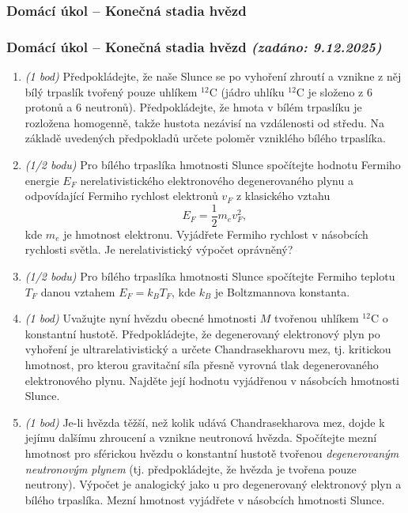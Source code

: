 \documentclass[a4paper,11pt,twoside]{article}
\newenvironment{homework}{}{}
\newcommand{\np}{\clearpage\newpage}
\newcommand{\exercise}[2][]{\ifthenelse{\isempty{#1}}
	{\np\thispagestyle{empty}\subsubsection*{Domácí úkol -- #2}}
	{\np\thispagestyle{empty}\np\subsubsection*{Domácí úkol -- #2 \small{\it{(zadáno: {#1})}}}}
}
\begin{document}
\begin{homework}
	\exercise[9.12.2025]{Konečná stadia hvězd}
		\begin{enumerate}
			\item \emph{(1 bod)}
				Předpokládejte, že naše Slunce se po vyhoření zhroutí a vznikne z něj bílý trpaslík tvořený pouze uhlíkem $^{12}\mathrm{C}$ (jádro uhlíku $^{12}\mathrm{C}$ je složeno z 6 protonů a 6 neutronů).
				Předpokládejte, že hmota v bílém trpaslíku je rozložena homogenně, takže hustota nezávisí na vzdálenosti od středu.
				Na základě uvedených předpokladů určete poloměr vzniklého bílého trpaslíka.

			\item \emph{(1/2 bodu)}
				Pro bílého trpaslíka hmotnosti Slunce spočítejte hodnotu Fermiho energie $E_{F}$ nerelativistického elektronového degenerovaného plynu a odpovídající Fermiho rychlost elektronů $v_{F}$ z klasického vztahu
				\begin{equation*}
					E_{F}=\frac{1}{2}m_{e}v_{F}^{2},
				\end{equation*}
				kde $m_{e}$ je hmotnost elektronu.
				Vyjádřete Fermiho rychlost v násobcích rychlosti světla.
				Je nerelativistický výpočet oprávněný?
			
			\item \emph{(1/2 bodu)}
				Pro bílého trpaslíka hmotnosti Slunce spočítejte Fermiho teplotu $T_{F}$ danou vztahem $E_{F}=k_{B}T_{F}$, kde $k_{B}$ je Boltzmannova konstanta.
				
			\item \emph{(1 bod)}				
				Uvažujte nyní hvězdu obecné hmotnosti $M$ tvořenou uhlíkem $^{12}\mathrm{C}$ o konstantní hustotě.
				Předpokládejte, že degenerovaný elektronový plyn po vyhoření je ultrarelativistický a určete Chandrasekharovu mez, tj. kritickou hmotnost, pro kterou gravitační síla přesně vyrovná tlak degenerovaného elektronového plynu.
				Najděte její hodnotu vyjádřenou v násobcích hmotnosti Slunce.
			
			\item \emph{(1 bod)}
			Je-li hvězda těžší, než kolik udává Chandrasekharova mez, dojde k jejímu dalšímu zhroucení a vznikne neutronová hvězda.
			Spočítejte mezní hmotnost pro sférickou hvězdu o konstantní hustotě tvořenou \emph{degenerovaným neutronovým plynem} (tj. předpokládejte, že hvězda je tvořena pouze neutrony). 
			Výpočet je analogický jako u pro degenerovaný elektronový plyn a bílého trpaslíka.
			Mezní hmotnost vyjádřete v násobcích hmotnosti Slunce.


\end{enumerate}
\end{homework}
\end{document}
